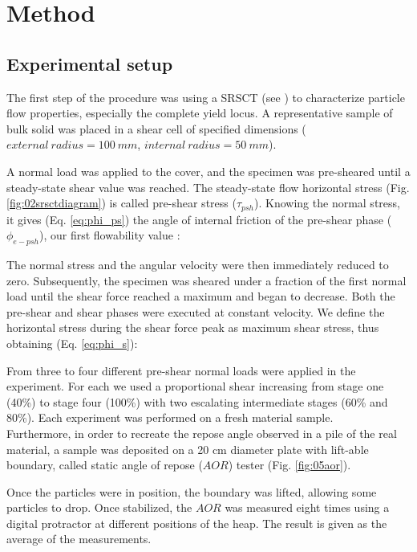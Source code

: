 
\section{Method}
\label{sec:method}


\subsection{Experimental setup}
\label{subsec:experimentalsetup}

The first step of the procedure was using a SRSCT (see \cite{RefWorks:142}) to characterize particle flow properties, especially the complete yield locus.
A representative sample of bulk solid was placed in a shear cell of specified dimensions ($external ~ radius = 100 ~ mm$, $internal ~ radius = 50 ~ mm$). 

A normal load was applied to the cover, and the specimen was pre-sheared  until a steady-state shear value was reached.
 The steady-state flow horizontal stress (Fig. \ref{fig:02srsctdiagram}) is
called pre-shear stress ($\tau_{psh}$). Knowing the normal stress, it gives (Eq. \ref{eq:phi_ps}) the angle of internal friction of the pre-shear phase 
($\phi_{e-psh}$), our first flowability value \cite{RefWorks:118}:
 

The normal stress and the angular velocity were then immediately reduced to zero. 
Subsequently, the specimen was sheared under a fraction of the first normal load until the shear force reached a maximum and began to decrease. 
Both the pre-shear and shear phases were executed at constant velocity. We define the horizontal stress during the shear force peak as maximum shear stress, 
thus obtaining (Eq. \ref{eq:phi_s})\cite{RefWorks:118}:
 
From three to four different pre-shear normal loads were applied in the experiment. For each we used
a proportional shear increasing from stage one (40\%) to stage four (100\%) with two escalating intermediate stages (60\% and 80\%).
Each experiment was performed on a fresh material sample. \\
Furthermore, in order to recreate the repose angle observed in a pile of the real material, a sample was deposited on a 20 cm diameter plate 
with lift-able boundary, called static angle of repose ($AOR$) tester (Fig. \ref{fig:05aor}).

Once the particles were in position, the boundary was lifted, allowing some
particles to drop. Once stabilized, the $AOR$ was measured eight times using a digital protractor at different positions of the heap. The result is given as the average of the measurements.



